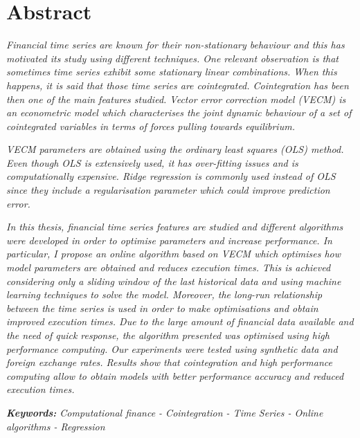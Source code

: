 \chapter*{Abstract}

\emph{Financial time series are known for their non-stationary behaviour and
this has motivated its study using different techniques. 
One relevant observation is that sometimes time series exhibit some stationary
linear combinations. When this happens, it is said that those time series are
cointegrated. Cointegration has been then one of the main features studied.
Vector error correction model (VECM) is an econometric model which characterises
the joint dynamic behaviour of a set of cointegrated variables in terms of
forces pulling towards equilibrium.}

\emph{VECM parameters are obtained using the ordinary least squares (OLS)
method.  Even though OLS is extensively used, it has over-fitting
issues and is computationally expensive. Ridge regression is commonly used
instead of OLS since they include a regularisation parameter which could improve
prediction error.}

\emph{In this thesis, financial time series features are studied and different
algorithms were developed in order to optimise parameters and increase performance.
In particular, I propose an online algorithm based on VECM which optimises how model parameters are obtained and reduces execution times. This is achieved considering only a sliding window of the last historical data and using machine learning techniques to solve the model. Moreover, the long-run relationship between the time series is used in order to make
optimisations and obtain improved execution times. 
Due to the large amount of financial data available and the need of quick response, 
the algorithm presented
was optimised using high performance computing.
Our experiments were tested using synthetic data and foreign exchange rates.
Results show that cointegration and high performance computing allow to obtain
models with better performance accuracy and reduced execution times.}

\vspace{0.8cm}

\emph{\textbf{Keywords:} Computational finance  - Cointegration  - Time Series - 
Online algorithms  - Regression}


